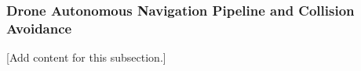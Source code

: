
\subsubsection{Drone Autonomous Navigation Pipeline and Collision Avoidance}
\label{subsubsec:design_7_5_drone_autonomy_collision}

[Add content for this subsection.]
